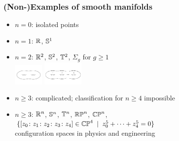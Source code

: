 \begin{frame}
  \frametitle{(Non-)Examples of smooth manifolds}
  \begin{itemize}
  \item $n=0$: isolated points
  \item $n=1$: $\mathbb{R}$, $\mathbb{S}^{1}$ %
  \item $n=2$: $\mathbb{R}^2$, $\mathbb{S}^{2}$, $\mathbb{T}^2$, $\Sigma_g$ for $g\geq 1$\\
  \includegraphics[width=1.5cm]{images/surface_genus_2.png}
  \includegraphics[width=2cm]{images/surface_genus_g.png}\pause
  \item $n\geq 3$: complicated; classification for $n\geq 4$ impossible
  \item $n\geq 3$: $\mathbb{R}^n$, $\mathbb{S}^{n}$, $\mathbb{T}^{n}$, $\mathbb{RP}^{n}$, $\mathbb{CP}^{n}$, $\{ [z_0\colon z_1\colon z_2\colon z_3\colon z_4]\in\mathbb{CP}^{4}\;\mid\; z_0^5+\dots+z_4^5=0\}$\\
  configuration spaces in physics and engineering
  \end{itemize}
\end{frame}

